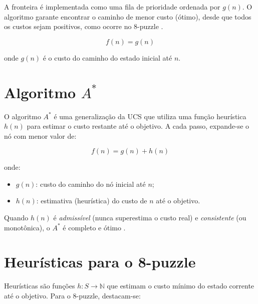 A fronteira é implementada como uma fila de prioridade ordenada por $g(n)$. O algoritmo garante encontrar o caminho de menor custo (ótimo), desde que todos os custos sejam positivos, como ocorre no 8-puzzle \cite{russell2010artificial}.  
  
\begin{equation}  
    f(n) = g(n)  
\end{equation}  
  
\noindent  
onde $g(n)$ é o custo do caminho do estado inicial até $n$.  
  
\section{Algoritmo $A^*$}  
  
O algoritmo $A^*$ é uma generalização da UCS que utiliza uma função heurística $h(n)$ para estimar o custo restante até o objetivo. A cada passo, expande-se o nó com menor valor de:  
  
\begin{equation}  
    f(n) = g(n) + h(n)  
\end{equation}  
  
\noindent  
onde:  
\begin{itemize}  
    \item $g(n)$: custo do caminho do nó inicial até $n$;  
    \item $h(n)$: estimativa (heurística) do custo de $n$ até o objetivo.  
\end{itemize}  
  
Quando $h(n)$ é \emph{admissível} (nunca superestima o custo real) e \emph{consistente} (ou monotônica), o $A^*$ é completo e ótimo \cite{russell2010artificial,luger2009artificial,nilsson1998,ertel2017}.  
  
\section{Heurísticas para o 8-puzzle}  
  
Heurísticas são funções $h: S \to \mathbb{N}$ que estimam o custo mínimo do estado corrente até o objetivo. Para o 8-puzzle, destacam-se:  
  
